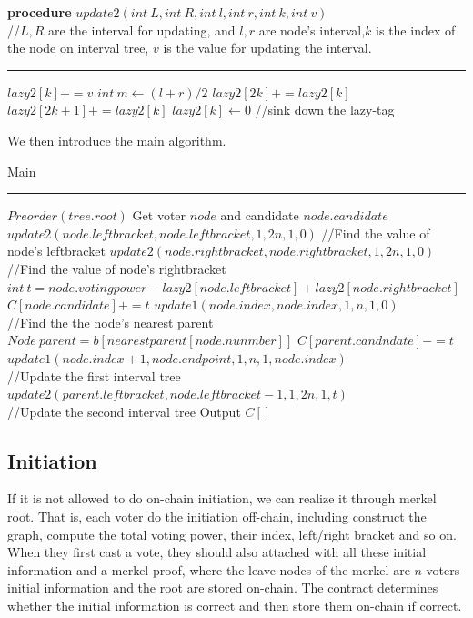\begin{algorithm}
	\textbf{procedure} $update2(int~L,int ~R, int~l, int~r, int~k, int~v)${\color{gray}
		\\//$L,R$ are the interval for updating, and $l,r$ are node's interval,$k$ is the index of the node on interval tree, $v$ is the value for updating the interval.}
	\hrule
	{
       $lazy2[k]+=v$
	}
	{
		$int~m \leftarrow (l+r)/2$\;
		$lazy2[2k] += lazy2[k]$\;
		$lazy2[2k+1]+= lazy2[k]$\;
		$lazy2[k] \leftarrow 0$
			{\color{gray}
		//sink down the lazy-tag}\;
    }
\end{algorithm}
We then introduce the main algorithm.
\begin{algorithm}
	\caption{Main}%
	\hrule
	$Preorder(tree.root)$\;
	{
		Get voter $node$ and candidate $node.candidate$\;
		$update2(node.leftbracket,node.leftbracket,1,2n,1,0)${\color{gray}
			//Find the value of node's leftbracket}\;
		$update2(node.rightbracket,node.rightbracket,1,2n,1,0)${\color{gray}
			//Find the value of node's rightbracket}\;
		$int~t=node.votingpower-lazy2[node.leftbracket]+lazy2[node.rightbracket]$\;
		$C[node.candidate]+=t$
		$update1(node.index,node.index,1,n,1,0)${\color{gray}
			\\//Find the the node's nearest parent}\;
		$Node~parent = b[nearestparent[node.nunmber]]$\;
		$C[parent.candndate]-=t$\;
		$update1(node.index+1,node.endpoint,1,n,1,node.index)${\color{gray}
			\\//Update the first interval tree}\;
		$update2(parent.leftbracket,node.leftbracket-1,1,2n,1,t)${\color{gray}
			\\//Update the second interval tree}\;
		Output $C[]$
	}
\end{algorithm}

\subsection{Initiation}
If it is not allowed to do on-chain initiation, we can realize it through merkel root. That is, each voter do the initiation off-chain, including construct the graph, compute the total voting power, their index, left/right bracket and so on. When they first cast a vote, they should also attached with all these initial  information and a merkel proof, where the leave nodes of the merkel are $n$ voters initial information and the root are stored on-chain. The contract determines whether the initial information is correct and then store them on-chain if correct.